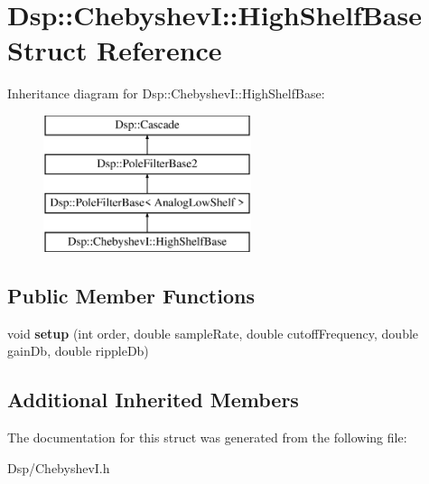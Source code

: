 \hypertarget{structDsp_1_1ChebyshevI_1_1HighShelfBase}{\section{Dsp\-:\-:Chebyshev\-I\-:\-:High\-Shelf\-Base Struct Reference}
\label{structDsp_1_1ChebyshevI_1_1HighShelfBase}
}
Inheritance diagram for Dsp\-:\-:Chebyshev\-I\-:\-:High\-Shelf\-Base\-:\begin{figure}[H]
\begin{center}
\leavevmode
\includegraphics[height=4.000000cm]{structDsp_1_1ChebyshevI_1_1HighShelfBase}
\end{center}
\end{figure}
\subsection*{Public Member Functions}
\begin{DoxyCompactItemize}
\item 
\hypertarget{structDsp_1_1ChebyshevI_1_1HighShelfBase_ac1256e73e5c5748a038868adfe0b05b4}{void {\bfseries setup} (int order, double sample\-Rate, double cutoff\-Frequency, double gain\-Db, double ripple\-Db)}\label{structDsp_1_1ChebyshevI_1_1HighShelfBase_ac1256e73e5c5748a038868adfe0b05b4}

\end{DoxyCompactItemize}
\subsection*{Additional Inherited Members}


The documentation for this struct was generated from the following file\-:\begin{DoxyCompactItemize}
\item 
Dsp/Chebyshev\-I.\-h\end{DoxyCompactItemize}
